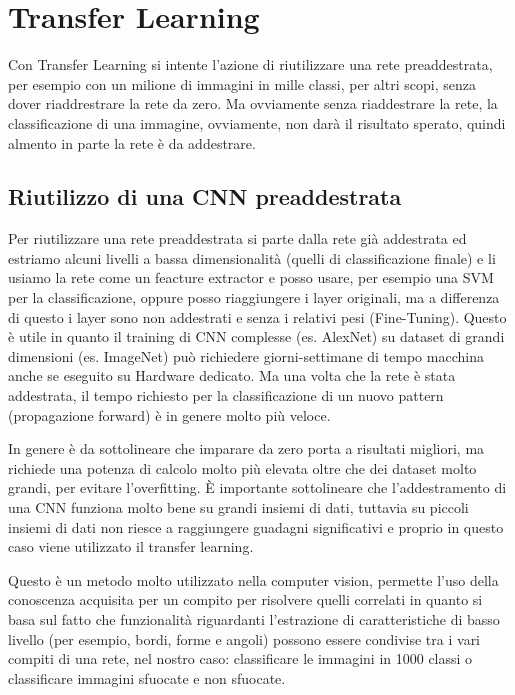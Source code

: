 \chapter{Transfer Learning}\label{transfer-learning}

Con Transfer Learning si intente l'azione di riutilizzare una rete preaddestrata, per esempio con un milione di immagini in mille classi, per altri scopi, senza dover riaddrestrare la rete da zero. Ma ovviamente senza riaddestrare la rete, la classificazione di una immagine, ovviamente, non darà il risultato sperato, quindi almento in parte la rete è da addestrare.

\section{Riutilizzo di una CNN preaddestrata}\label{riutilizzo-di-una-cnn-preaddestrata}

Per riutilizzare una rete preaddestrata si parte dalla rete già addestrata ed estriamo alcuni livelli a bassa dimensionalità (quelli di classificazione finale) e li usiamo la rete come un feacture extractor  e posso usare, per esempio una SVM per la classificazione, oppure posso riaggiungere i layer originali, ma a differenza di questo i layer sono non addestrati e senza i relativi pesi (Fine-Tuning). Questo è utile in quanto il training di CNN complesse (es. AlexNet) su dataset di grandi dimensioni (es. ImageNet) può richiedere giorni-settimane di tempo macchina anche se eseguito su Hardware dedicato. Ma una volta che la rete è stata addestrata, il tempo richiesto per la classificazione di un nuovo pattern (propagazione forward) è in genere molto più veloce\cite{yosinski_tl}\cite{unibo_maltoni_ml}.

In genere è da sottolineare che imparare da zero porta a risultati migliori, ma richiede una potenza di calcolo molto più  elevata oltre che dei dataset molto grandi, per evitare l'\gls{overfitting}. È importante sottolineare che l'addestramento di una CNN funziona molto bene su grandi insiemi di dati, tuttavia su piccoli insiemi di dati non riesce a raggiungere guadagni significativi e proprio in questo caso viene utilizzato il transfer learning\cite{joel_tl}.

Questo è un metodo molto utilizzato nella computer vision, permette l'uso della conoscenza acquisita per un
compito per risolvere quelli correlati in quanto si basa sul fatto che
funzionalità riguardanti l'estrazione di caratteristiche di basso livello
(per esempio, bordi, forme e angoli) possono essere condivise tra i vari compiti di una rete, nel nostro caso: classificare le immagini in 1000 classi o classificare immagini sfuocate e non sfuocate\cite{patrini_tl}.




